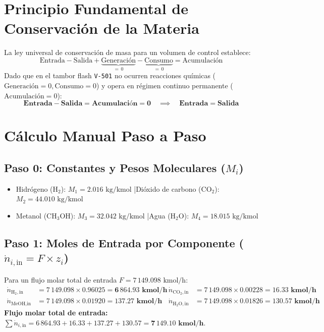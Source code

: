 \documentclass[11pt,letterpaper]{article}
\begin{document}
\section{Principio Fundamental de Conservación de la Materia}

La ley universal de conservación de masa para un volumen de control establece:
\begin{equation}
    \text{Entrada} - \text{Salida} + \underbrace{\text{Generación}}_{=\,0} - \underbrace{\text{Consumo}}_{=\,0} = \text{Acumulación}
\end{equation}
Dado que en el tambor flash \texttt{V-501} no ocurren reacciones químicas ($\text{Generación} = 0, \text{Consumo} = 0$) y opera en régimen continuo permanente ($\text{Acumulación} = 0$):
\begin{equation}
    \mathbf{\text{Entrada} - \text{Salida} = \text{Acumulación} = 0 \quad \implies \quad \text{Entrada} = \text{Salida}}
\end{equation}

\clearpage
\section{Cálculo Manual Paso a Paso}

\subsection{\texorpdfstring{Paso 0: Constantes y Pesos Moleculares ($M_i$)}{Paso 0: Constantes y Pesos Moleculares}}
\begin{itemize}[itemsep=1pt]
    \item Hidrógeno ($\text{H}_2$): $M_1 = 2.016\text{ kg/kmol}$ \quad|\quad Dióxido de carbono ($\text{CO}_2$): $M_2 = 44.010\text{ kg/kmol}$
    \item Metanol ($\text{CH}_3\text{OH}$): $M_3 = 32.042\text{ kg/kmol}$ \quad|\quad Agua ($\text{H}_2\text{O}$): $M_4 = 18.015\text{ kg/kmol}$
\end{itemize}

\subsection{\texorpdfstring{Paso 1: Moles de Entrada por Componente ($\dot{n}_{i,\text{in}} = F \times z_i$)}{Paso 1: Moles de Entrada por Componente}}
Para un flujo molar total de entrada $F = 7\,149.098\text{ kmol/h}$:
\begin{align*}
    \dot{n}_{\text{H}_2,\text{in}} &= 7\,149.098 \times 0.96025 = \mathbf{6\,864.93\text{ kmol/h}} &
    \dot{n}_{\text{CO}_2,\text{in}} &= 7\,149.098 \times 0.00228 = \mathbf{16.33\text{ kmol/h}} \\
    \dot{n}_{\text{MeOH},\text{in}} &= 7\,149.098 \times 0.01920 = \mathbf{137.27\text{ kmol/h}} &
    \dot{n}_{\text{H}_2\text{O},\text{in}} &= 7\,149.098 \times 0.01826 = \mathbf{130.57\text{ kmol/h}}
\end{align*}
\textbf{Flujo molar total de entrada:}\quad $\sum \dot{n}_{i,\text{in}} = 6\,864.93 + 16.33 + 137.27 + 130.57 = \mathbf{7\,149.10\text{ kmol/h}}$.
\end{document}
